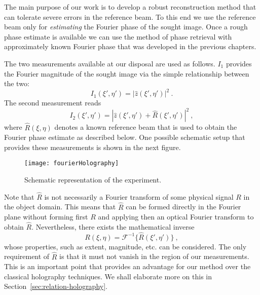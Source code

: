 The main purpose of our work is to develop a robust reconstruction
method that can tolerate severe errors in the reference beam. To
this end we use the reference beam only for \textit{estimating}
the Fourier phase of the sought image. Once a rough phase estimate
is available we can use the method of phase retrieval with
approximately known Fourier phase that was developed in
the previous chapters.

The two measurements available at our disposal are used as follows.
$I_{1}$ provides the Fourier magnitude of the sought image via the
simple relationship between the two:
\begin{equation}
  \label{eq:phase-holo-2}
  I_{1}(\xi',\eta') = |\hat{z}(\xi',\eta')|^{2}\ .
\end{equation}
The second measurement reads
\begin{equation}
  \label{eq:phase-holo-3}
  I_{2}(\xi',\eta') =|\hat{z}(\xi',\eta') + \hat{R}(\xi',\eta')|^{2}\ ,
\end{equation}
where $\hat{R}(\xi, \eta)$ denotes a known reference beam that is
used to obtain the Fourier phase estimate as described below. One
possible schematic setup that provides these measurements is shown
in the next figure.
\begin{figure}[H]
  \centering
  \texttt{[image: fourierHolography]}
  \caption{Schematic representation of the experiment.}
  \label{fig:experiment-schematic}
\end{figure}
Note that $\hat{R}$ is not
necessarily a Fourier transform of some physical signal $R$ in the
object domain. This means that $\hat{R}$ can be formed directly in
the Fourier plane without forming first $R$ and applying then an
optical Fourier transform to obtain $\hat{R}$.  Nevertheless,
there exists the mathematical inverse
\begin{equation}
  \label{eq:phase-holo-4}
  R(\xi,\eta) = \mathcal{F}^{-1}\{\hat{R}(\xi',\eta')\}\ ,
\end{equation}
whose properties, such as extent, magnitude, etc. can be
considered. The only requirement of $\hat{R}$ is that it must not
vanish in the region of our measurements. This is an important
point that provides an advantage for our method over the classical
holography techniques. We shall elaborate more on this in
Section~\ref{sec:relation-holography}.

